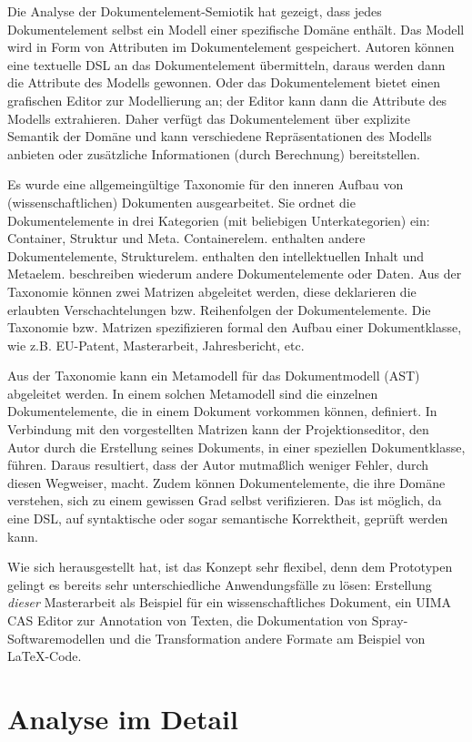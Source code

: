 
Die Analyse der Dokumentelement-Semiotik hat gezeigt, dass jedes Dokumentelement selbst ein Modell einer spezifische Domäne enthält. Das Modell wird in Form von Attributen im Dokumentelement gespeichert. Autoren können eine textuelle DSL an das Dokumentelement übermitteln, daraus werden dann die Attribute des Modells gewonnen. Oder das Dokumentelement bietet einen grafischen Editor zur Modellierung an; der Editor kann dann die Attribute des Modells extrahieren. Daher verfügt das Dokumentelement über explizite Semantik der Domäne und kann verschiedene Repräsentationen des Modells anbieten oder zusätzliche Informationen (durch Berechnung) bereitstellen.

 
Es wurde eine allgemeingültige Taxonomie für den inneren Aufbau von (wissenschaftlichen) Dokumenten ausgearbeitet. Sie ordnet die Dokumentelemente in drei Kategorien (mit beliebigen Unterkategorien) ein: Container, Struktur und Meta. Containerelem. enthalten andere Dokumentelemente, Strukturelem. enthalten den intellektuellen Inhalt und Metaelem. beschreiben wiederum andere Dokumentelemente oder Daten. Aus der Taxonomie können zwei Matrizen abgeleitet werden, diese deklarieren die erlaubten Verschachtelungen bzw. Reihenfolgen der Dokumentelemente. Die Taxonomie bzw. Matrizen spezifizieren formal den Aufbau einer Dokumentklasse, wie z.B. EU-Patent, Masterarbeit, Jahresbericht, etc.

 
Aus der Taxonomie kann ein Metamodell für das Dokumentmodell (AST) abgeleitet werden. In einem solchen Metamodell sind die einzelnen Dokumentelemente, die in einem Dokument vorkommen können, definiert. In Verbindung mit den vorgestellten Matrizen kann der Projektionseditor, den Autor durch die Erstellung seines Dokuments, in einer speziellen Dokumentklasse, führen. Daraus resultiert, dass der Autor mutmaßlich weniger Fehler, durch diesen Wegweiser, macht. Zudem können Dokumentelemente, die ihre Domäne verstehen, sich zu einem gewissen Grad selbst verifizieren. Das ist möglich, da eine DSL, auf syntaktische oder sogar semantische Korrektheit, geprüft werden kann.

 
Wie sich herausgestellt hat, ist das Konzept sehr flexibel, denn dem Prototypen gelingt es bereits sehr unterschiedliche Anwendungsfälle zu lösen: Erstellung \emph{dieser} Masterarbeit als Beispiel für ein wissenschaftliches Dokument, ein UIMA CAS Editor zur Annotation von Texten, die Dokumentation von Spray-Softwaremodellen und die Transformation andere Formate am Beispiel von LaTeX-Code.

 
\section{Analyse im Detail}\label{}
 
